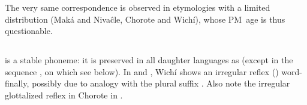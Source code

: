 \begin{exe}
    \ex \returnth
    \ex \pll
    \ex \inhabitant
    \ex \tell
    \ex \sisinlaw
    \ex \soninlaw
    \ex \elderbro
    \ex \sunn
    \ex \withstand
    \ex \killv
    \ex \snail
    \ex \flee
    \ex \pet
    \ex \chaniarf
    \ex \chaniart
    \ex \spank
    \ex \offspring
    \ex \wash
    \ex \whitelim
    \ex \ashes
    \ex \winter
    \ex \iscayante
    \ex \many \label{l-many}
    \ex \bow
    \ex \returnh
    \ex \leg \label{l-leg}
    \ex \wildcat
    \ex \anteater
    \ex \acquainted
    \ex \blind
    \ex \rheum
    \ex \walk
    \ex \jelayuk
    \ex \shadow
    \ex \chaguara
    \ex \widower
    \ex \parrot
    \ex \doveula
    \ex \lessergrison
\end{exe}

The very same correspondence is observed in etymologies with a limited distribution (Maká and Nivaĉle, Chorote and Wichí), whose PM~age is thus questionable.

\begin{exe}
    \ex \brightness
    \ex \pocote
    \ex \fry
    \ex \locustcw
    \ex \cheek
    \ex \smooth
    \ex \feel
    \ex \willow
    \ex \agile
    \ex \skycloud
    \ex \gutscw
    \ex \cicada
    \ex \leafhaircw
    \ex \dirt
    \ex \orphanmn
    \ex \diecw
    \ex \hiccup
    \ex \heartcw
\end{exe}

\subsection{}\label{proto-y}
 is a stable phoneme: it is preserved in all daughter languages as  (except in the sequence , on which see below). In  and , Wichí shows an irregular reflex () word-finally, possibly due to analogy with the plural suffix . Also note the irregular glottalized reflex in Chorote in .

\begin{exe}
    \ex \honeycomb
    \ex \gofirst
    \ex \yicaay
    \ex \namen
    \ex \algarrobof \label{y-algarrobof}
    \ex \rightn
    \ex \notafraid
    \ex \breath
    \ex \drinkv \label{y-drinkv}
    \ex \dew
    \ex \wax
    \ex \leniosa
    \ex \hand
    \ex \sunn
    \ex \coldn
    \ex \barnowl
    \ex \nightmonkey
    \ex \savannahhawk
    \ex \rope
    \ex \pathn
    \ex \bitter
    \ex \hear
    \ex \rain \label{y-rain}
    \ex \costume
    \ex \wildcat
    \ex \shoot
    \ex \movev
    \ex \bromelia
    \ex \bat
    \ex \wildhoney
    \ex \mistolf
    \ex \mistolt
    \ex \wildbean
    \ex \mosquito
\end{exe}

